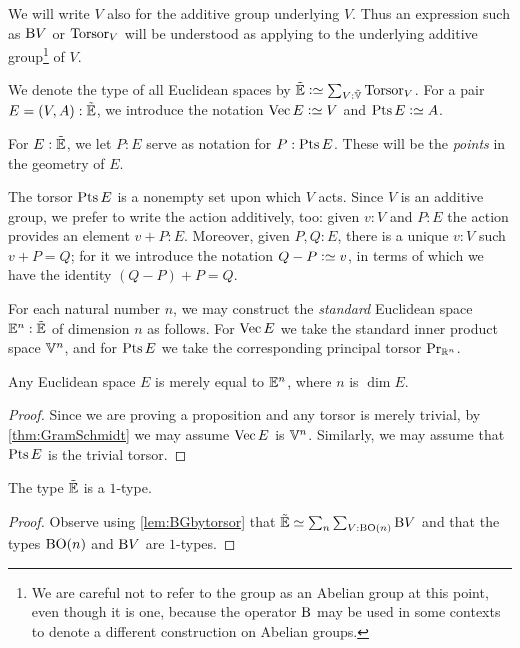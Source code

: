 We will write $V$ also for the additive group underlying $V$.  Thus an
expression such as $\mathrm{B} V$ or $\mathrm{Torsor}_V$ will be understood as applying to
the underlying additive group\footnote{We are careful not to refer to the group
  as an Abelian group at this point, even though it is one, because the
  operator $\mathrm{B}$ may be used in some contexts to denote a different construction
  on Abelian groups.}
of $V$.

We denote the type of all Euclidean spaces by $\ES \defeq \sum_{V:\OS} \typetorsor_V$.
For a pair $E = (V,A) : {\tilde {\mathbb E}}$, we introduce the notation $\Vectors E \defeq V$ and $\Points E \defeq A$.

For $E:{\tilde {\mathbb E}}$, we let $P:E$ serve as notation for $P:\Points E$.  These will be
the {\em points} in the geometry of $E$.

The torsor $\Points E$ is a nonempty set upon which $V$ acts.  Since $V$ is an
additive group, we prefer to write the action additively, too: given $v:V$ and
$P:E$ the action provides an element $v+P:E$.  Moreover, given $P,Q:E$, there
is a unique $v:V$ such $v+P = Q$; for it we introduce the notation $Q-P \defeq
v$, in terms of which we have the identity $(Q-P)+P=Q$.

For each natural number $n$, we may construct the {\em standard} Euclidean
space $\mathbb E^n : {\tilde {\mathbb E}}$ of dimension $n$ as follows.  For $\Vectors E$ we take the
standard inner product space $\mathbb V^n$, and for $\Points E$ we take the
corresponding principal torsor $\mathrm{Pr}_{{\mathbb{R}^n}}$.

\begin{theorem}\label{thm:EuclideanNormalization}
  Any Euclidean space $E$ is merely equal to $\mathbb E^n$, where $n$ is $\dim E$.
\end{theorem}

\begin{proof}
  Since we are proving a proposition and any torsor is merely trivial, by
  \cref{thm:GramSchmidt} we may assume $\Vectors E$ is $\mathbb V^n$.  Similarly, we
  may assume that $\Points E$ is the trivial torsor.
\end{proof}

\begin{lemma}\label{lem:EuclideanSpace1Type}
  The type ${\tilde {\mathbb E}}$ is a $1$-type.
\end{lemma}

\begin{proof}
  Observe using \cref{lem:BGbytorsor} that
  ${\tilde {\mathbb E}} \simeq \sum_n \sum_{V:\mathrm{B} \mathrm{O}(n)} \mathrm{B} V$ and that the
  types $\mathrm{B} \mathrm{O}(n)$ and $\mathrm{B} V$ are $1$-types.
\end{proof}

